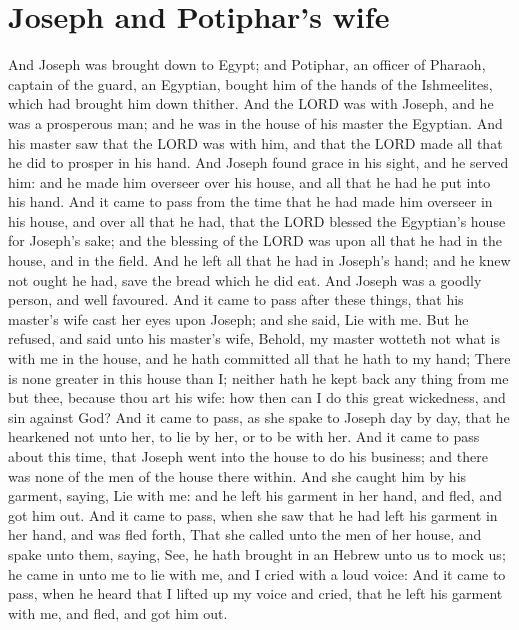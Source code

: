 \section*{Joseph and Potiphar's wife}
\begin{biblechapter} %
\verse And Joseph was brought down to Egypt; and Potiphar, an officer of Pharaoh, captain of the guard, an Egyptian, bought him of the hands of the Ishmeelites, which had brought him down thither.
\verse And the LORD was with Joseph, and he was a prosperous man; and he was in the house of his master the Egyptian.
\verse And his master saw that the LORD was with him, and that the LORD made all that he did to prosper in his hand.
\verse And Joseph found grace in his sight, and he served him: and he made him overseer over his house, and all that he had he put into his hand.
\verse And it came to pass from the time that he had made him overseer in his house, and over all that he had, that the LORD blessed the Egyptian's house for Joseph's sake; and the blessing of the LORD was upon all that he had in the house, and in the field.
\verse And he left all that he had in Joseph's hand; and he knew not ought he had, save the bread which he did eat. And Joseph was a goodly person, and well favoured.
\verse And it came to pass after these things, that his master's wife cast her eyes upon Joseph; and she said, Lie with me.
\verse But he refused, and said unto his master's wife, Behold, my master wotteth not what is with me in the house, and he hath committed all that he hath to my hand;
\verse There is none greater in this house than I; neither hath he kept back any thing from me but thee, because thou art his wife: how then can I do this great wickedness, and sin against God?
\verse And it came to pass, as she spake to Joseph day by day, that he hearkened not unto her, to lie by her, or to be with her.
\verse And it came to pass about this time, that Joseph went into the house to do his business; and there was none of the men of the house there within.
\verse And she caught him by his garment, saying, Lie with me: and he left his garment in her hand, and fled, and got him out.
\verse And it came to pass, when she saw that he had left his garment in her hand, and was fled forth,
\verse That she called unto the men of her house, and spake unto them, saying, See, he hath brought in an Hebrew unto us to mock us; he came in unto me to lie with me, and I cried with a loud voice:
\verse And it came to pass, when he heard that I lifted up my voice and cried, that he left his garment with me, and fled, and got him out.

\end{biblechapter}
